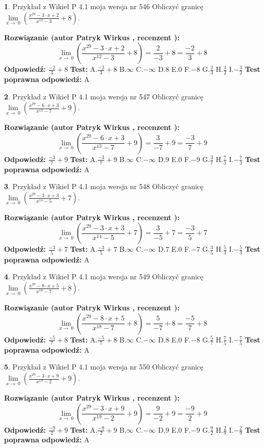\documentclass[12pt, a4paper]{article}
\theoremstyle{definition} %
\newtheorem{zad}{}
\newcommand{\zadStart}[1]{\begin{zad}#1\newline}
\newcommand{\zadStop}{\end{zad}}
\newcommand{\rozwStart}[2]{\noindent \textbf{Rozwiązanie (autor #1 , recenzent #2): }\newline}
\newcommand{\rozwStop}{\newline}
\newcommand{\odpStart}{\noindent \textbf{Odpowiedź:}\newline}
\newcommand{\odpStop}{\newline}
\newcommand{\testStart}{\noindent \textbf{Test:}\newline}
\newcommand{\testStop}{\newline}
\newcommand{\kluczStart}{\noindent \textbf{Test poprawna odpowiedź:}\newline}
\newcommand{\kluczStop}{\newline}
\begin{document}
\zadStart{Przykład z Wikieł P 4.1 moja wersja nr 546}
Obliczyć granicę $\lim\limits_{x\to\ 0}(\frac{x^{29}-3 \cdot x +2}{x^{12}-3}+8)$.
\zadStop
\rozwStart{Patryk Wirkus}{}
$$\lim\limits_{x\to\ 0}(\frac{x^{29}-3 \cdot x +2}{x^{12}-3}+8)=\frac{2}{-3}+8=\frac{-2}{3}+8$$
\rozwStop
\odpStart
$\frac{-2}{3}+8$
\odpStop
\testStart
A.$\frac{-2}{3}+8$
B.$\infty$
C.$-\infty$
D.$8$
E.$0$
F.$-8$
G.$\frac{2}{3}$
H.$\frac{3}{2}$
I.$-\frac{3}{2}$
\testStop
\kluczStart
A
\kluczStop



\zadStart{Przykład z Wikieł P 4.1 moja wersja nr 547}
Obliczyć granicę $\lim\limits_{x\to\ 0}(\frac{x^{29}-6 \cdot x +3}{x^{13}-7}+9)$.
\zadStop
\rozwStart{Patryk Wirkus}{}
$$\lim\limits_{x\to\ 0}(\frac{x^{29}-6 \cdot x +3}{x^{13}-7}+9)=\frac{3}{-7}+9=\frac{-3}{7}+9$$
\rozwStop
\odpStart
$\frac{-3}{7}+9$
\odpStop
\testStart
A.$\frac{-3}{7}+9$
B.$\infty$
C.$-\infty$
D.$9$
E.$0$
F.$-9$
G.$\frac{3}{7}$
H.$\frac{7}{3}$
I.$-\frac{7}{3}$
\testStop
\kluczStart
A
\kluczStop



\zadStart{Przykład z Wikieł P 4.1 moja wersja nr 548}
Obliczyć granicę $\lim\limits_{x\to\ 0}(\frac{x^{29}-3 \cdot x +3}{x^{14}-5}+7)$.
\zadStop
\rozwStart{Patryk Wirkus}{}
$$\lim\limits_{x\to\ 0}(\frac{x^{29}-3 \cdot x +3}{x^{14}-5}+7)=\frac{3}{-5}+7=\frac{-3}{5}+7$$
\rozwStop
\odpStart
$\frac{-3}{5}+7$
\odpStop
\testStart
A.$\frac{-3}{5}+7$
B.$\infty$
C.$-\infty$
D.$7$
E.$0$
F.$-7$
G.$\frac{3}{5}$
H.$\frac{5}{3}$
I.$-\frac{5}{3}$
\testStop
\kluczStart
A
\kluczStop



\zadStart{Przykład z Wikieł P 4.1 moja wersja nr 549}
Obliczyć granicę $\lim\limits_{x\to\ 0}(\frac{x^{29}-8 \cdot x +5}{x^{18}-7}+8)$.
\zadStop
\rozwStart{Patryk Wirkus}{}
$$\lim\limits_{x\to\ 0}(\frac{x^{29}-8 \cdot x +5}{x^{18}-7}+8)=\frac{5}{-7}+8=\frac{-5}{7}+8$$
\rozwStop
\odpStart
$\frac{-5}{7}+8$
\odpStop
\testStart
A.$\frac{-5}{7}+8$
B.$\infty$
C.$-\infty$
D.$8$
E.$0$
F.$-8$
G.$\frac{5}{7}$
H.$\frac{7}{5}$
I.$-\frac{7}{5}$
\testStop
\kluczStart
A
\kluczStop



\zadStart{Przykład z Wikieł P 4.1 moja wersja nr 550}
Obliczyć granicę $\lim\limits_{x\to\ 0}(\frac{x^{29}-3 \cdot x +9}{x^{19}-2}+9)$.
\zadStop
\rozwStart{Patryk Wirkus}{}
$$\lim\limits_{x\to\ 0}(\frac{x^{29}-3 \cdot x +9}{x^{19}-2}+9)=\frac{9}{-2}+9=\frac{-9}{2}+9$$
\rozwStop
\odpStart
$\frac{-9}{2}+9$
\odpStop
\testStart
A.$\frac{-9}{2}+9$
B.$\infty$
C.$-\infty$
D.$9$
E.$0$
F.$-9$
G.$\frac{9}{2}$
H.$\frac{2}{9}$
I.$-\frac{2}{9}$
\testStop
\kluczStart
A
\kluczStop
\end{document}
